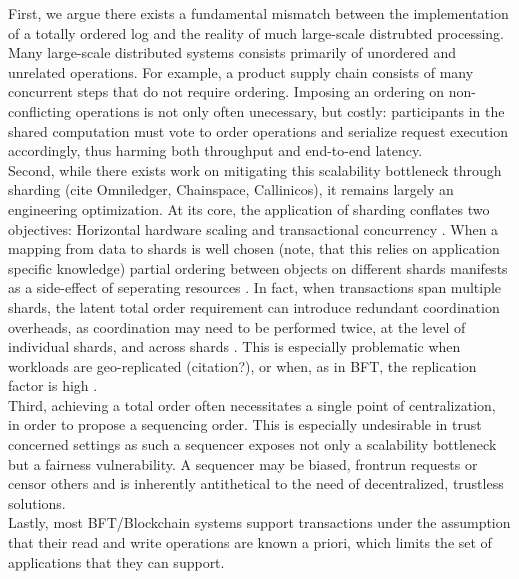 \iffalse
{}
First, we argue there exists a fundamental mismatch between the implementation of a totally ordered log and the reality of much large-scale distrubted processing. Many large-scale distributed systems consists primarily of unordered and unrelated operations. For example, a product supply chain consists of many concurrent steps that do not require ordering. Imposing an ordering on non-conflicting operations is not only often unecessary, but costly: participants in the shared computation must vote to order operations and serialize request execution accordingly, thus harming both throughput and end-to-end latency. \\

Second, while there exists work on mitigating this scalability bottleneck through sharding (cite Omniledger, Chainspace, Callinicos), it remains largely an engineering optimization. At its core, the application of sharding conflates two objectives: Horizontal hardware scaling and transactional concurrency . When a mapping from data to shards is well chosen (note, that this relies on application specific knowledge) partial ordering between objects on different shards manifests as a side-effect of seperating resources . In fact, when transactions span multiple shards, the latent total order requirement can introduce redundant coordination overheads, as coordination may need to be performed twice, at the level of individual shards, and across shards \cite{zhang2016operation}. This is especially problematic when workloads are geo-replicated (citation?), or when, as in BFT, the replication factor is high . \\

Third, achieving a total order often  necessitates a single point of centralization, in order to propose a sequencing order. This is especially undesirable in trust concerned settings as such a sequencer exposes not only a scalability bottleneck but a fairness vulnerability. A sequencer may be biased, frontrun requests or censor others and is inherently antithetical to the need of decentralized, trustless solutions.\\

Lastly, most BFT/Blockchain systems support transactions under the assumption that their read and write operations are known a priori, which limits the set of applications that they can support. 


